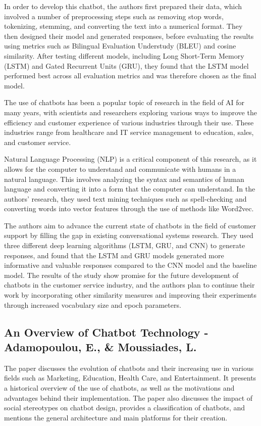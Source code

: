 \documentclass[12pt, twoside]{article}
\begin{document}
In order to develop this chatbot, the authors first prepared their data, which involved a number of preprocessing steps such as removing stop words, tokenizing, stemming, and converting the text into a numerical format. They then designed their model and generated responses, before evaluating the results using metrics such as Bilingual Evaluation Understudy (BLEU) and cosine similarity. After testing different models, including Long Short-Term Memory (LSTM) and Gated Recurrent Units (GRU), they found that the LSTM model performed best across all evaluation metrics and was therefore chosen as the final model.

The use of chatbots has been a popular topic of research in the field of AI for many years, with scientists and researchers exploring various ways to improve the efficiency and customer experience of various industries through their use. These industries range from healthcare and IT service management to education, sales, and customer service.

Natural Language Processing (NLP) is a critical component of this research, as it allows for the computer to understand and communicate with humans in a natural language. This involves analyzing the syntax and semantics of human language and converting it into a form that the computer can understand. In the authors' research, they used text mining techniques such as spell-checking and converting words into vector features through the use of methods like Word2vec.

The authors aim to advance the current state of chatbots in the field of customer support by filling the gap in existing conversational systems research. They used three different deep learning algorithms (LSTM, GRU, and CNN) to generate responses, and found that the LSTM and GRU models generated more informative and valuable responses compared to the CNN model and the baseline model. The results of the study show promise for the future development of chatbots in the customer service industry, and the authors plan to continue their work by incorporating other similarity measures and improving their experiments through increased vocabulary size and epoch parameters.


\subsection{An Overview of Chatbot Technology - Adamopoulou, E., \& Moussiades, L.\cite{2}}
The paper discusses the evolution of chatbots and their increasing use in various fields such as Marketing, Education, Health Care, and Entertainment. It presents a historical overview of the use of chatbots, as well as the motivations and advantages behind their implementation. The paper also discusses the impact of social stereotypes on chatbot design, provides a classification of chatbots, and mentions the general architecture and main platforms for their creation.
\end{document}
